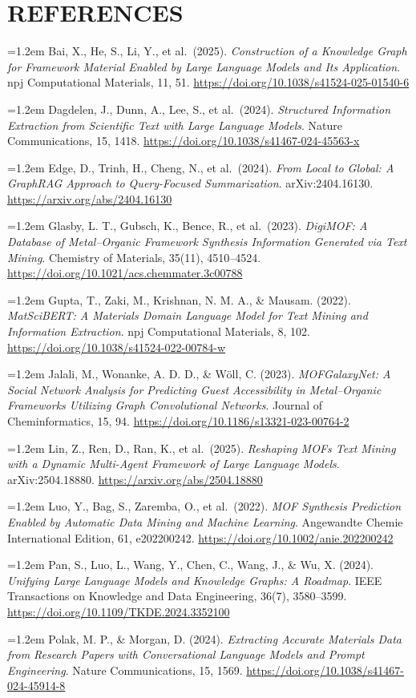 \documentclass[11pt,a4paper]{article}
\newcommand{\refentry}[1]{\par\hangindent=1.2em\hangafter=1 #1\par\vspace{0.5ex}}
\begin{document}
\section*{\textcolor{srhorange}{REFERENCES}}
\small
\refentry{Bai, X., He, S., Li, Y., et al.\ (2025). \textit{Construction of a Knowledge Graph for Framework Material Enabled by Large Language Models and Its Application}. npj Computational Materials, 11, 51. \url{https://doi.org/10.1038/s41524-025-01540-6}}
\refentry{Dagdelen, J., Dunn, A., Lee, S., et al.\ (2024). \textit{Structured Information Extraction from Scientific Text with Large Language Models}. Nature Communications, 15, 1418. \url{https://doi.org/10.1038/s41467-024-45563-x}}
\refentry{Edge, D., Trinh, H., Cheng, N., et al.\ (2024). \textit{From Local to Global: A GraphRAG Approach to Query-Focused Summarization}. arXiv:2404.16130. \url{https://arxiv.org/abs/2404.16130}}
\refentry{Glasby, L. T., Gubsch, K., Bence, R., et al.\ (2023). \textit{DigiMOF: A Database of Metal--Organic Framework Synthesis Information Generated via Text Mining}. Chemistry of Materials, 35(11), 4510--4524. \url{https://doi.org/10.1021/acs.chemmater.3c00788}}
\refentry{Gupta, T., Zaki, M., Krishnan, N. M. A., \& Mausam. (2022). \textit{MatSciBERT: A Materials Domain Language Model for Text Mining and Information Extraction}. npj Computational Materials, 8, 102. \url{https://doi.org/10.1038/s41524-022-00784-w}}
\refentry{Jalali, M., Wonanke, A. D. D., \& W\"oll, C. (2023). \textit{MOFGalaxyNet: A Social Network Analysis for Predicting Guest Accessibility in Metal--Organic Frameworks Utilizing Graph Convolutional Networks}. Journal of Cheminformatics, 15, 94. \url{https://doi.org/10.1186/s13321-023-00764-2}}
\refentry{Lin, Z., Ren, D., Ran, K., et al.\ (2025). \textit{Reshaping MOFs Text Mining with a Dynamic Multi-Agent Framework of Large Language Models}. arXiv:2504.18880. \url{https://arxiv.org/abs/2504.18880}}
\refentry{Luo, Y., Bag, S., Zaremba, O., et al.\ (2022). \textit{MOF Synthesis Prediction Enabled by Automatic Data Mining and Machine Learning}. Angewandte Chemie International Edition, 61, e202200242. \url{https://doi.org/10.1002/anie.202200242}}
\refentry{Pan, S., Luo, L., Wang, Y., Chen, C., Wang, J., \& Wu, X. (2024). \textit{Unifying Large Language Models and Knowledge Graphs: A Roadmap}. IEEE Transactions on Knowledge and Data Engineering, 36(7), 3580--3599. \url{https://doi.org/10.1109/TKDE.2024.3352100}}
\refentry{Polak, M. P., \& Morgan, D. (2024). \textit{Extracting Accurate Materials Data from Research Papers with Conversational Language Models and Prompt Engineering}. Nature Communications, 15, 1569. \url{https://doi.org/10.1038/s41467-024-45914-8}}
\end{document}
